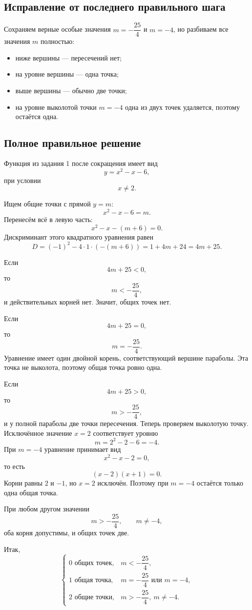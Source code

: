 \documentclass[12pt,a4paper]{article}
\begin{document}
\subsection*{Исправление от последнего правильного шага}
Сохраняем верные особые значения $m=-\dfrac{25}{4}$ и $m=-4$, но разбиваем все значения $m$ полностью:
\begin{itemize}
\item ниже вершины --- пересечений нет;
\item на уровне вершины --- одна точка;
\item выше вершины --- обычно две точки;
\item на уровне выколотой точки $m=-4$ одна из двух точек удаляется, поэтому остаётся одна.
\end{itemize}

\subsection*{Полное правильное решение}
Функция из задания 1 после сокращения имеет вид
\[
y=x^2-x-6,
\]
при условии
\[
x\ne2.
\]

Ищем общие точки с прямой $y=m$:
\[
x^2-x-6=m.
\]
Перенесём всё в левую часть:
\[
x^2-x-(m+6)=0.
\]
Дискриминант этого квадратного уравнения равен
\[
D=(-1)^2-4\cdot1\cdot(-(m+6))=1+4m+24=4m+25.
\]

Если
\[
4m+25<0,
\]
то
\[
m<-\frac{25}{4},
\]
и действительных корней нет. Значит, общих точек нет.

Если
\[
4m+25=0,
\]
то
\[
m=-\frac{25}{4}.
\]
Уравнение имеет один двойной корень, соответствующий вершине параболы. Эта точка не выколота, поэтому общая точка ровно одна.

Если
\[
4m+25>0,
\]
то
\[
m>-\frac{25}{4},
\]
и у полной параболы две точки пересечения. Теперь проверяем выколотую точку. Исключённое значение $x=2$ соответствует уровню
\[
m=2^2-2-6=-4.
\]
При $m=-4$ уравнение принимает вид
\[
x^2-x-2=0,
\]
то есть
\[
(x-2)(x+1)=0.
\]
Корни равны $2$ и $-1$, но $x=2$ исключён. Поэтому при $m=-4$ остаётся только одна общая точка.

При любом другом значении
\[
m>-\frac{25}{4},\qquad m\ne-4,
\]
оба корня допустимы, и общих точек две.

Итак,
\[
\begin{cases}
0\text{ общих точек}, & m<-\dfrac{25}{4},\\[4pt]
1\text{ общая точка}, & m=-\dfrac{25}{4}\text{ или }m=-4,\\[4pt]
2\text{ общие точки}, & m>-\dfrac{25}{4},\ m\ne-4.
\end{cases}
\]
\end{document}
